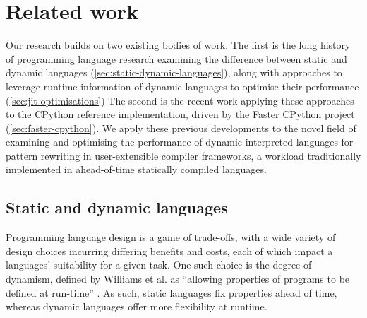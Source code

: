 \chapter{Related work}
\label{chap:related-work}

%
%

Our research builds on two existing bodies of work.
The first is the long history of programming language research examining the difference between static and dynamic languages (\autoref{sec:static-dynamic-languages}), along with approaches to leverage runtime information of dynamic languages to optimise their performance (\autoref{sec:jit-optimisations})
The second is the recent work applying these approaches to the CPython reference implementation, driven by the Faster CPython project (\autoref{sec:faster-cpython}).
We apply these previous developments to the novel field of examining and optimising the performance of dynamic interpreted languages for pattern rewriting in user-extensible compiler frameworks, a workload traditionally implemented in ahead-of-time statically compiled languages.


\section{Static and dynamic languages}
\label{sec:static-dynamic-languages}

Programming language design is a game of trade-offs, with a wide variety of design choices incurring differing benefits and costs, each of which impact a languages' suitability for a given task.
One such choice is the degree of dynamism, defined by Williams et al. as ``allowing properties of programs to be defined at run-time'' \cite{williamsDynamicInterpretationDynamic2010}. As such, static languages fix properties ahead of time, whereas dynamic languages offer more flexibility at runtime.

